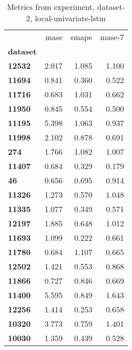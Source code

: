 \begin{table}[h]
\centering
\caption{Metrics from experiment, dataset-2, local-univariate-lstm}
\label{table:local-univariate-lstm-dataset-2}
\begin{tabular}{lrrr}
\toprule
{} &   mase &  smape &  mase-7 \\
\textbf{dataset} &        &        &         \\
\midrule
\textbf{12532  } &  2.017 &  1.085 &   1.100 \\
\textbf{11694  } &  0.841 &  0.360 &   0.522 \\
\textbf{11716  } &  0.683 &  1.031 &   0.662 \\
\textbf{11950  } &  0.845 &  0.554 &   0.500 \\
\textbf{11195  } &  5.398 &  1.063 &   0.937 \\
\textbf{11998  } &  2.102 &  0.878 &   0.691 \\
\textbf{274    } &  1.766 &  1.082 &   1.007 \\
\textbf{11407  } &  0.684 &  0.329 &   0.179 \\
\textbf{46     } &  0.656 &  0.695 &   0.914 \\
\textbf{11326  } &  1.273 &  0.570 &   1.048 \\
\textbf{11335  } &  1.077 &  0.349 &   0.571 \\
\textbf{12197  } &  1.885 &  0.648 &   1.012 \\
\textbf{11693  } &  1.099 &  0.222 &   0.661 \\
\textbf{11780  } &  0.684 &  1.107 &   0.665 \\
\textbf{12502  } &  1.421 &  0.553 &   0.868 \\
\textbf{11866  } &  0.727 &  0.846 &   0.669 \\
\textbf{11400  } &  5.595 &  0.849 &   1.643 \\
\textbf{12256  } &  1.414 &  0.253 &   0.658 \\
\textbf{10320  } &  3.773 &  0.759 &   1.401 \\
\textbf{10030  } &  1.359 &  0.439 &   0.528 \\
\bottomrule
\end{tabular}
\end{table}
